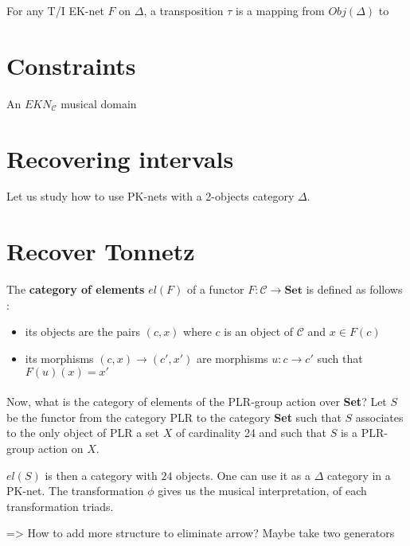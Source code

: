 \begin{defn}
    For any T/I EK-net $F$ on $\Delta$, a transposition $\tau$ is a mapping from $Obj(\Delta)$ to $ $
\end{defn}


\section{Constraints}

\begin{defn}[EK-domain]
    An $EKN_\mathcal{C}$ musical domain
\end{defn}

\begin{defn}

\end{defn}


\section{Recovering intervals}

Let us study how to use PK-nets with a 2-objects category $\Delta$.






\section{Recover Tonnetz}


\begin{defn} The \textbf{category of elements} $el(F)$ of a functor $F : \mathcal{C}\rightarrow \textbf{Set}$ is defined as follows :
    \begin{itemize}
        \item its objects are the pairs $(c,x)$ where $c$ is an object of $\mathcal{C}$ and $x\in F(c)$
        \item its morphisms $(c,x)\rightarrow (c',x')$ are morphisms $u : c\rightarrow c'$ such that $F(u)(x) = x'$
    \end{itemize}
\end{defn}
\paragraph{}
Now, what is the category of elements of the PLR-group action over \textbf{Set}? Let $S$ be the functor from the category PLR to the category \textbf{Set} such that $S$ associates to the only object of PLR a set $X$ of cardinality 24 and such that $S$ is a PLR-group action on $X$.

$el(S)$ is then a category with $24$ objects. One can use it as a $\Delta$ category in a PK-net. The transformation $\phi$ gives us the musical interpretation, of each transformation triads.

=> How to add more structure to eliminate arrow? Maybe take two generators
